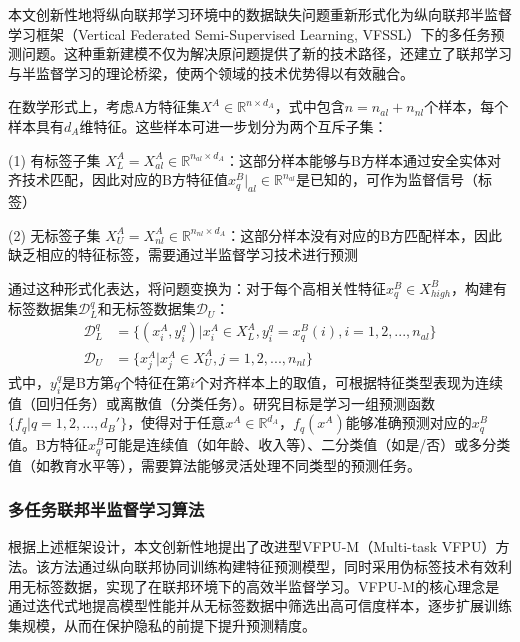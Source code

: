 本文创新性地将纵向联邦学习环境中的数据缺失问题重新形式化为纵向联邦半监督学习框架（Vertical Federated Semi-Supervised Learning, VFSSL）下的多任务预测问题。这种重新建模不仅为解决原问题提供了新的技术路径，还建立了联邦学习与半监督学习的理论桥梁，使两个领域的技术优势得以有效融合。

在数学形式上，考虑A方特征集$X^A \in \mathbb{R}^{n \times d_A}$，式中包含$n = n_{al} + n_{nl}$个样本，每个样本具有$d_A$维特征。这些样本可进一步划分为两个互斥子集：

(1) 有标签子集 $X^A_{L} = X^A_{al} \in \mathbb{R}^{n_{al} \times d_A}$：这部分样本能够与B方样本通过安全实体对齐技术匹配，因此对应的B方特征值$x^B_q|_{al} \in \mathbb{R}^{n_{al}}$是已知的，可作为监督信号（标签）

(2) 无标签子集 $X^A_{U} = X^A_{nl} \in \mathbb{R}^{n_{nl} \times d_A}$：这部分样本没有对应的B方匹配样本，因此缺乏相应的特征标签，需要通过半监督学习技术进行预测

通过这种形式化表达，将问题变换为：对于每个高相关性特征$x^B_q \in X^B_{high}$，构建有标签数据集$\mathcal{D}_L^q$和无标签数据集$\mathcal{D}_U$：
\begin{equation}
	\begin{split}
		\mathcal{D}_{L}^{q} &= \{(x_{i}^{A},y_{i}^{q})|x_{i}^{A}\in X_{L}^{A},y_{i}^{q}=x_{q}^{B}(i),i=1,2,...,{{n}_{al}}\} \\
		{{\mathcal{D}}}_{U} &= \{x_{j}^{A}|x_{j}^{A}\in X_{U}^{A},j=1,2,...,{{n}_{nl}}\}
	\end{split}
\end{equation}
式中，$y_i^q$是B方第$q$个特征在第$i$个对齐样本上的取值，可根据特征类型表现为连续值（回归任务）或离散值（分类任务）。研究目标是学习一组预测函数$\{f_q | q = 1,2,...,d_B'\}$，使得对于任意$x^A \in \mathbb{R}^{d_A}$，$f_q(x^A)$能够准确预测对应的$x^B_q$值。B方特征$x^B_q$可能是连续值（如年龄、收入等）、二分类值（如是/否）或多分类值（如教育水平等），需要算法能够灵活处理不同类型的预测任务。

\subsubsection{多任务联邦半监督学习算法}
根据上述框架设计，本文创新性地提出了改进型VFPU-M（Multi-task VFPU）方法。该方法通过纵向联邦协同训练构建特征预测模型，同时采用伪标签技术有效利用无标签数据，实现了在联邦环境下的高效半监督学习。VFPU-M的核心理念是通过迭代式地提高模型性能并从无标签数据中筛选出高可信度样本，逐步扩展训练集规模，从而在保护隐私的前提下提升预测精度。

